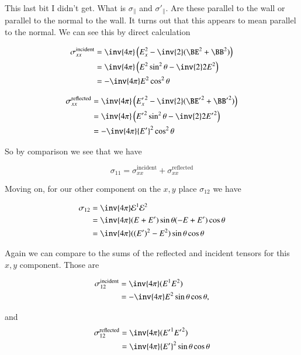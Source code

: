 This last bit I didn't get.  What is $\sigma_\parallel$ and ${\sigma'}_\parallel$.  Are these parallel to the wall or parallel to the normal to the wall.  It turns out that this appears to mean parallel to the normal.  We can see this by direct calculation

\begin{align*}
\sigma_{x x}^{\text{incident}} 
&= \inv{4 \pi} \left( 
E_x^2 - \inv{2} (\BE^2 + \BB^2)
\right) \\
&= \inv{4 \pi} \left( 
E^2 \sin^2 \theta - \inv{2} 2 E^2 
\right) \\
&= -\inv{4 \pi} E^2 \cos^2\theta
\end{align*}

\begin{align*}
{\sigma}_{x x}^{\text{reflected}} 
&= \inv{4 \pi} \left( 
{E_x'}^2 - \inv{2} ({\BE'}^2 + {\BB'}^2)
\right) \\
&= \inv{4 \pi} \left( 
{E'}^2 \sin^2 \theta - \inv{2} 2 {E'}^2 
\right) \\
&= -\inv{4 \pi} {E'}^2 \cos^2\theta
\end{align*}

So by comparison we see that we have

\begin{equation}\label{eqn:relativisticElectrodynamicsT9:620}
\sigma_{1 1} = {\sigma}_{x x}^{\text{incident}} +{\sigma}_{x x}^{\text{reflected}} 
\end{equation}

Moving on, for our other component on the $x,y$ place $\sigma_{12}$ we have

\begin{align*}
\sigma_{12} 
&= \inv{4 \pi} \mathcal{E}^1 \mathcal{E}^2 \\
&= \inv{4 \pi} (E + E') \sin\theta (-E + E') \cos\theta \\
&= \inv{4 \pi} ((E')^2 - E^2) \sin\theta \cos\theta 
\end{align*}

Again we can compare to the sums of the reflected and incident tensors for this $x,y$ component.  Those are

\begin{align*}
\sigma_{12}^{\text{incident}} 
&= 
\inv{4 \pi} ( E^1 E^2 ) \\
&= 
-\inv{4 \pi} E^2 \sin\theta \cos\theta,
\end{align*}

and
\begin{align*}
\sigma_{12}^{\text{reflected}} 
&= 
\inv{4 \pi} ( {E'}^1 {E'}^2 ) \\
&= 
\inv{4 \pi} {E'}^2 \sin\theta \cos\theta
\end{align*}

